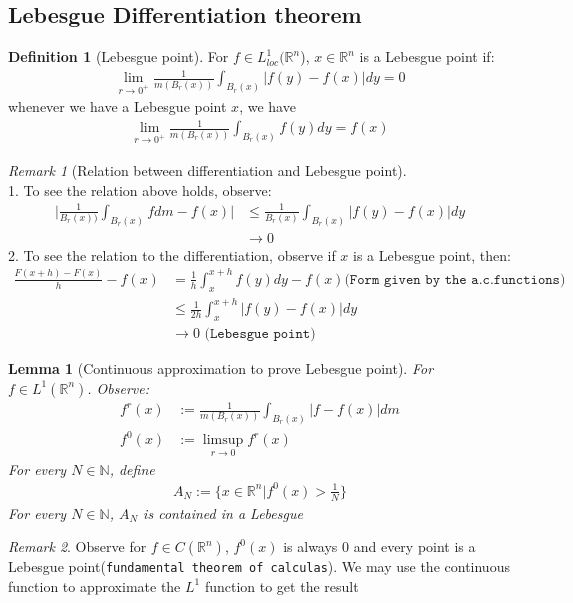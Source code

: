 \documentclass[a4paper,11pt,fleqn]{book}
\newtheorem{lemma}[theorem]{Lemma}
\theoremstyle{definition}
\newtheorem{definition}{Definition}[section]
\theoremstyle{remark}
\newtheorem*{remark}{Remark}
\begin{document}
\subsection{Lebesgue Differentiation theorem}
\begin{definition}[Lebesgue point]
	For $f \in L_{loc}^1(\mathbb{R}^n$), $ x \in \mathbb{R}^n$ is a Lebesgue point if:
	\begin{align*}
		\lim_{r \rightarrow 0^+}\frac{1}{m(B_r(x))} \int_{B_r(x)}|f(y) - f(x)|dy = 0
	\end{align*}
	whenever we have a Lebesgue point $x$, we have
	\begin{align*}
		\lim_{r \rightarrow 0^+}\frac{1}{m(B_r(x))} \int_{B_r(x)} f(y) dy = f(x)
	\end{align*}
\end{definition}
\begin{remark}[Relation between differentiation and Lebesgue point]
\quad\\
1. To see the relation above holds, observe:
\begin{align*}
	\bigg|\frac{1}{B_r(x))}\int_{B_r(x)} f dm - f(x)\bigg| &\le 
	\frac{1}{B_r(x)} \int_{B_r(x)} |f(y) - f(x)|dy\\
	&\rightarrow 0
\end{align*}
2. To see the relation to the differentiation, observe if $x$ is a Lebesgue point, then:
\begin{align*}
	\frac{F(x + h) - F(x)}{h} - f(x) &= \frac{1}{h} \int_x^{x + h}f(y) dy - f(x)\texttt{(Form given by the a.c.functions)}\\
	&\le \frac{1}{2h}\int_x^{x + h} |f(y) - f(x)| dy \\
	& \rightarrow 0 \texttt{ (Lebesgue point)}
\end{align*}
\end{remark}

\begin{lemma}[Continuous approximation to prove Lebesgue point]
	For $f \in L^1(\mathbb{R}^n)$. Observe:
	\begin{align*}
		f^r(x)&:= \frac{1}{m(B_r(x))} \int_{B_r(x)} |f - f(x)|dm\\ f^0(x)&:= \limsup_{r \rightarrow 0}f^r(x) 
	\end{align*}
	For every $N \in \mathbb{N}$, define
	\begin{align*}
		A_N:= \bigg\{x \in \mathbb{R}^n| f^0(x) > \frac{1}{N}\bigg\}
	\end{align*}
	For every $N \in \mathbb{N}$, $A_N$ is contained in a Lebesgue  
\end{lemma}
\begin{remark}
Observe for $f \in C(\mathbb{R}^n)$, $f^0(x)$ is always 0 and every point is a Lebesgue point(\texttt{fundamental theorem of calculas}). We may use the continuous function to approximate the $L^1$ function to get the result	
\end{remark}
\end{document}

